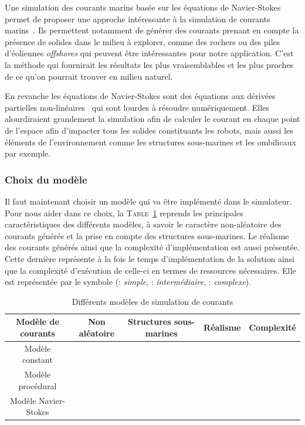				Une simulation des courants marins basée sur les équations de Navier-Stokes permet de proposer une approche intéressante à la simulation de courants marins~\cite{Garau2006current}. Ils permettent notamment de générer des courants prenant en compte la présence de solides dans le milieu à explorer, comme des rochers ou des piles d'éoliennes \textit{offshores} qui peuvent être intéressantes pour notre application. C'est la méthode qui fournirait les résultats les plus vraisemblables et les plus proches de ce qu'on pourrait trouver en milieu naturel.

				En revanche les équations de Navier-Stokes sont des équations aux dérivées partielles non-linéaires~\cite{hinch2012hydrodynamique} qui sont lourdes à résoudre numériquement. Elles alourdiraient grandement la simulation afin de calculer le courant en chaque point de l'espace afin d'impacter tous les solides constituants les robots, mais aussi les éléments de l'environnement comme les structures sous-marines et les ombilicaux par exemple.

			\subsubsection{Choix du modèle}

				Il faut maintenant choisir un modèle qui va être implémenté dans le simulateur. Pour nous aider dans ce choix, la \textsc{Table}~\ref{table:courants} reprends les principales caractéristiques des différents modèles, à savoir le caractère non-aléatoire des courants générés et la prise en compte des structures sous-marines. Le réalisme des courants générés ainsi que la complexité d'implémentation est aussi présentée. Cette dernière représente à la fois le temps d'implémentation de la solution ainsi que la complexité d'exécution de celle-ci en termes de ressources nécessaires. Elle est représentée par le symbole \pmark (\pmark : \textit{simple}, \pmark \pmark : \textit{intermédiaire}, \pmark \pmark \pmark : \textit{complexe}).

				\begin{table}[ht]
					\centering
					\begin{adjustbox}{max width=\textwidth}
						\begin{tabular}{|c|c|c|c|c|}
							\hline
							\textbf{Modèle de courants} & \textbf{Non aléatoire} & \textbf{Structures sous-marines} & \textbf{Réalisme} & \textbf{Complexité} \\
							\hline
							Modèle constant & \cmark & \xmark & \pmark \pmark & \pmark\\
							\hline
							Modèle procédural & \xmark & \xmark & \pmark & \pmark \pmark \\
							\hline
							Modèle Navier-Stokes & \cmark & \cmark & \pmark \pmark \pmark & \pmark \pmark \pmark \\
							\hline
						\end{tabular}
					\end{adjustbox}
					\caption{Différents modèles de simulation de courants}
					\label{table:courants}
				\end{table}

